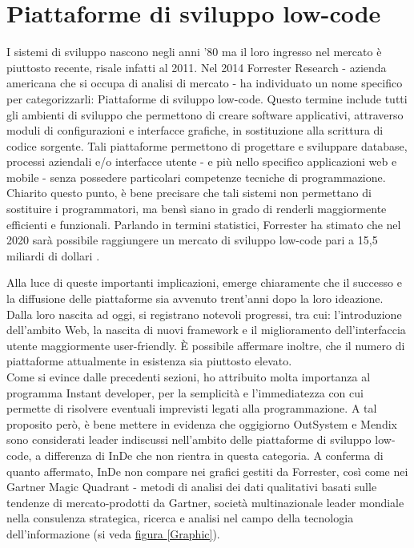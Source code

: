 \section{Piattaforme di sviluppo low-code}
I sistemi di sviluppo nascono negli anni '80 ma il loro ingresso nel mercato è piuttosto recente, risale infatti al 2011.  Nel 2014 Forrester Research - azienda americana che si occupa di analisi di mercato - ha individuato un nome specifico per categorizzarli: Piattaforme di sviluppo low-code. 
Questo termine include tutti gli ambienti di sviluppo che permettono di creare software applicativi, attraverso moduli di configurazioni e interfacce grafiche, in sostituzione alla scrittura di codice sorgente\cite{[17]}.
Tali piattaforme permettono di progettare e sviluppare database, processi aziendali e/o interfacce utente - e più nello specifico applicazioni web e mobile - senza possedere particolari competenze tecniche di programmazione. Chiarito questo punto, è bene precisare che tali sistemi non permettano di sostituire i programmatori, ma bensì siano in grado di renderli maggiormente efficienti e funzionali. Parlando in termini statistici, Forrester ha stimato che nel 2020 sarà possibile raggiungere un mercato di sviluppo low-code pari a 15,5 miliardi di dollari \cite{[17]}.

Alla luce di queste importanti implicazioni, emerge chiaramente che il successo e la diffusione delle piattaforme sia avvenuto trent'anni dopo la loro ideazione.
Dalla loro nascita ad oggi, si registrano notevoli progressi, tra cui: l'introduzione dell'ambito Web, la nascita di nuovi framework e il miglioramento dell'interfaccia utente maggiormente user-friendly. 
È possibile affermare inoltre, che il numero di piattaforme attualmente in esistenza sia piuttosto elevato.\\

Come si evince dalle precedenti sezioni, ho attribuito molta importanza al programma Instant developer, per la semplicità e l'immediatezza con cui permette di risolvere eventuali imprevisti legati alla programmazione. 
A tal proposito però, è bene mettere in evidenza che oggigiorno OutSystem e Mendix  sono considerati leader indiscussi nell'ambito delle piattaforme di sviluppo low-code, a differenza di InDe che non rientra in questa categoria. 
A conferma di quanto affermato, InDe non compare nei grafici gestiti da Forrester, così come nei Gartner Magic Quadrant - metodi di analisi dei dati qualitativi basati sulle tendenze di mercato-prodotti da Gartner, società multinazionale leader mondiale nella consulenza strategica, ricerca e analisi nel campo della tecnologia dell'informazione (si veda \hyperref[Graphic]{figura \ref{Graphic}}).

